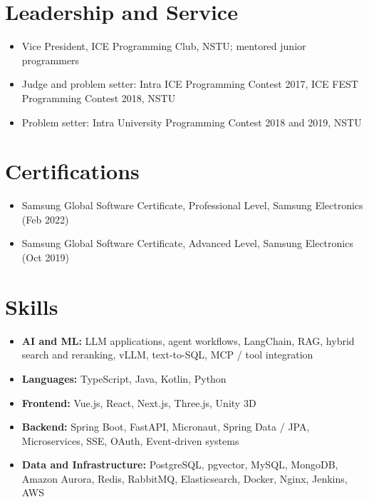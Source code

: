 \documentclass[10pt,letterpaper]{article}
\begin{document}
\section{Leadership and Service}
\begin{itemize}
  \item Vice President, ICE Programming Club, NSTU; mentored junior programmers
  \item Judge and problem setter: Intra ICE Programming Contest 2017, ICE FEST Programming Contest 2018, NSTU
  \item Problem setter: Intra University Programming Contest 2018 and 2019, NSTU
\end{itemize}

\section{Certifications}
\begin{itemize}
  \item Samsung Global Software Certificate, Professional Level, Samsung Electronics (Feb 2022)
  \item Samsung Global Software Certificate, Advanced Level, Samsung Electronics (Oct 2019)
\end{itemize}

\section{Skills}
\begin{itemize}
  \item \textbf{AI and ML:} LLM applications, agent workflows, LangChain, RAG, hybrid search and reranking, vLLM, text-to-SQL, MCP / tool integration
  \item \textbf{Languages:} TypeScript, Java, Kotlin, Python
  \item \textbf{Frontend:} Vue.js, React, Next.js, Three.js, Unity 3D
  \item \textbf{Backend:} Spring Boot, FastAPI, Micronaut, Spring Data / JPA, Microservices, SSE, OAuth, Event-driven systems
  \item \textbf{Data and Infrastructure:} PostgreSQL, pgvector, MySQL, MongoDB, Amazon Aurora, Redis, RabbitMQ, Elasticsearch, Docker, Nginx, Jenkins, AWS
\end{itemize}
\end{document}
